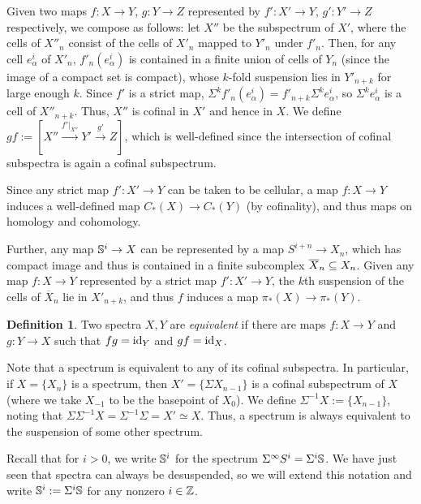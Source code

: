 \documentclass[11pt, titlepage]{article} %
\def\bb{\ensuremath\mathbb}
\def\subq{\ensuremath\subseteq}
\def\inte{\ensuremath\mathbb{Z}}
\def\id{\ensuremath\text{id}}
\numberwithin{equation}{subsection}
\theoremstyle{plain}
\theoremstyle{definition}
\newtheorem{definition}[theorem]{Definition}
\begin{document}
Given two maps \(f : X \to Y\), \(g : Y \to Z\) represented by \(f' : X' \to Y\), \(g' : Y' \to Z\) respectively, we compose as follows: let \(X''\) be the subspectrum of \(X'\), where the cells of \(X''_n\) consist of the cells of \(X'_n\) mapped to \(Y'_n\) under \(f'_n\). Then, for any cell \(e^i_\alpha\) of \(X'_n\), \(f'_n(e^i_\alpha)\) is contained in a finite union of cells of \(Y_n\) (since the image of a compact set is compact), whose \(k\)-fold suspension lies in \(Y'_{n+k}\) for large enough \(k\). Since \(f'\) is a strict map, \(\Sigma^kf'_n(e^i_\alpha)=f'_{n+k}\Sigma^ke^i_\alpha\), so \(\Sigma^ke^i_\alpha\) is a cell of \(X''_{n+k}\). Thus, \(X''\) is cofinal in \(X'\) and hence in \(X\). We define \(gf := [X'' \xrightarrow{f'|_{X''}}Y' \xrightarrow{g'}Z]\), which is well-defined since the intersection of cofinal subspectra is again a cofinal subspectrum. 

Since any strict map \(f' : X' \to Y\) can be taken to be cellular, a map \(f : X \to Y\) induces a well-defined map \(C_*(X)\to C_*(Y)\) (by cofinality), and thus maps on homology and cohomology. 

Further, any map \(\bb{S}^i\to X\) can be represented by a map \(S^{i+n}\to X_n\), which has compact image and thus is contained in a finite subcomplex \(\overline X_n \subq X_n\). Given any map \(f : X \to Y\) represented by a strict map \(f' : X' \to Y\), the \(k\)th suspension of the cells of \(\overline X_n\) lie in \(X'_{n+k}\), and thus \(f\) induces a map \(\pi_*(X) \to \pi_*(Y)\). %

\begin{definition}
Two spectra \(X, Y\) are \textit{equivalent} if there are maps \(f : X \to Y\) and \(g : Y \to X\) such that \(fg=\id_{Y}\) and \(gf=\id_X\).
\end{definition}

Note that a spectrum is equivalent to any of its cofinal subspectra. In particular, if \(X=\{X_n\}\) is a spectrum, then \(X'=\{\Sigma X_{n-1}\}\) is a cofinal subspectrum of \(X\) (where we take \(X_{-1}\) to be the basepoint of \(X_0\)). We define \(\Sigma^{-1}X:=\{X_{n-1}\}\), noting that \(\Sigma \Sigma^{-1}X=\Sigma^{-1}\Sigma=X'\simeq X\). Thus, a spectrum is always equivalent to the suspension of some other spectrum.

Recall that for \(i>0\), we write \(\bb{S}^i\) for the spectrum \(\Sigma^\infty S^i=\Sigma^i \bb{S}\). We have just seen that spectra can always be desuspended, so we will extend this notation and write \(\bb{S}^i:=\Sigma^i \bb{S}\) for any nonzero \(i\in \inte\). 
\end{document}
